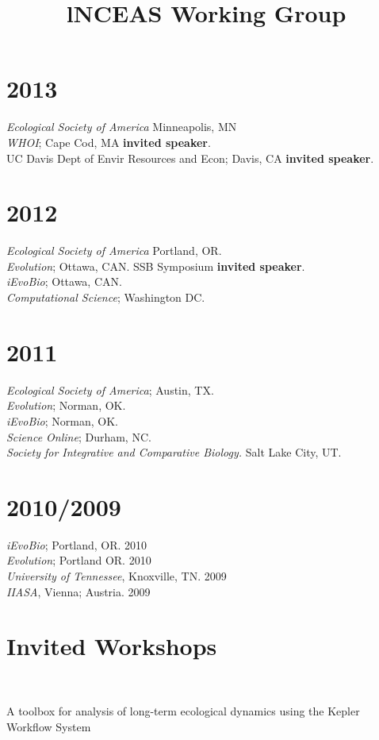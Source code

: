 \documentclass[margin]{res}
\begin{document}
\begin{resume}
\section{\textnormal{2013}}
  \emph{Ecological Society of America} Minneapolis, MN \\ 
  \emph{WHOI}; Cape Cod, MA \textbf{invited speaker}.\\
  UC Davis Dept of Envir Resources and Econ; Davis, CA \textbf{invited speaker}.\\
\section{\textnormal{2012}}
  \emph{Ecological Society of America} Portland, OR. \\ 
  \emph{Evolution}; Ottawa, CAN. SSB Symposium \textbf{invited speaker}.\\
  \emph{iEvoBio}; Ottawa, CAN. \\
  \emph{Computational Science}; Washington DC. 
\section{\textnormal{2011}}
  \emph{Ecological Society of America}; Austin, TX. \\
  \emph{Evolution}; Norman, OK. \\
  \emph{iEvoBio}; Norman, OK. \\
  \emph{Science Online}; Durham, NC.\\
  \emph{Society for Integrative and Comparative Biology.} Salt Lake City, UT. \\
 \section{\textnormal{2010/2009}}
  \emph{iEvoBio}; Portland, OR. 2010 \\
  \emph{Evolution}; Portland OR. 2010 \\
 \emph{University of Tennessee}, Knoxville, TN. 2009 \\
 \emph{IIASA}, Vienna; Austria. 2009


\section{Invited Workshops}
\begin{format}
\title{l} \\
\body
\end{format}

\title{NCEAS Working Group}
\begin{position}
A toolbox for analysis of long-term ecological dynamics using the Kepler Workflow System
\vspace{-.25cm}
\end{position}



\end{resume}
\end{document}

